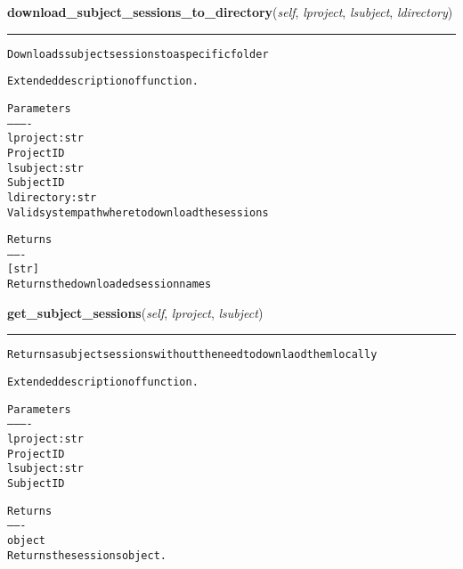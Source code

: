     \label{source:Xnat:Xnat:download_subject_sessions_to_directory}

    \vspace{0.5ex}

\hspace{.8\funcindent}\begin{boxedminipage}{\funcwidth}

    \raggedright \textbf{download\_subject\_sessions\_to\_directory}(\textit{self}, \textit{lproject}, \textit{lsubject}, \textit{ldirectory})

    \vspace{-1.5ex}

    \rule{\textwidth}{0.5\fboxrule}
\setlength{\parskip}{2ex}
\begin{alltt}

Downloads subject sessions to a specific folder

Extended description of function.

Parameters
----------
lproject : str
    Project ID
lsubject : str
    Subject ID
ldirectory: str
    Valid system path where to download the sessions

Returns
-------
[str]
    Returns the downloaded session names
\end{alltt}

\setlength{\parskip}{1ex}
    \end{boxedminipage}

    \label{source:Xnat:Xnat:get_subject_sessions}

    \vspace{0.5ex}

\hspace{.8\funcindent}\begin{boxedminipage}{\funcwidth}

    \raggedright \textbf{get\_subject\_sessions}(\textit{self}, \textit{lproject}, \textit{lsubject})

    \vspace{-1.5ex}

    \rule{\textwidth}{0.5\fboxrule}
\setlength{\parskip}{2ex}
\begin{alltt}

Returns a subject sessions without the need to downlaod them locally

Extended description of function.

Parameters
----------
lproject : str
    Project ID
lsubject : str
    Subject ID

Returns
-------
object
    Returns the sessions object.
\end{alltt}

\setlength{\parskip}{1ex}
    \end{boxedminipage}

